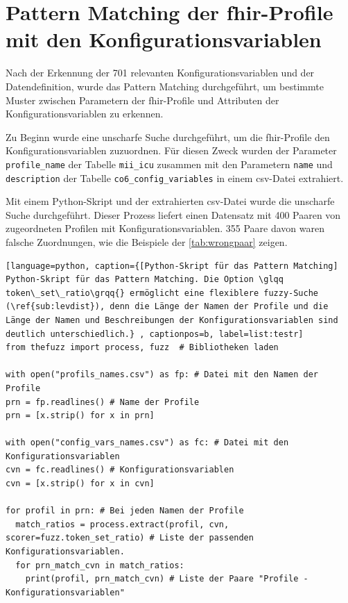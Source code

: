\section{Pattern Matching der \acs{fhir}-Profile mit den Konfigurationsvariablen} \label{sec:pattmach}

Nach der Erkennung der 701 relevanten Konfigurationsvariablen und der Datendefinition, wurde das Pattern Matching durchgeführt, um bestimmte Muster zwischen Parametern der \ac{fhir}-Profile und Attributen der Konfigurationsvariablen zu erkennen. 

Zu Beginn wurde eine unscharfe Suche durchgeführt, um die \ac{fhir}-Profile den Konfigurationsvariablen zuzuordnen. Für diesen Zweck wurden der Parameter \texttt{profile\_name} der Tabelle \texttt{mii\_icu} zusammen mit den Parametern \texttt{name} und \texttt{description} der Tabelle \texttt{co6\_config\_variables} in einem \ac{csv}-Datei extrahiert. 

Mit einem Python-Skript und der extrahierten \ac{csv}-Datei wurde die unscharfe Suche durchgeführt. Dieser Prozess liefert einen Datensatz mit 400 Paaren von zugeordneten Profilen mit Konfigurationsvariablen. 355 Paare davon waren falsche Zuordnungen, wie die Beispiele der \ref{tab:wrongpaar} zeigen.

\begin{lstlisting}[language=python, caption={[Python-Skript für das Pattern Matching] Python-Skript für das Pattern Matching. Die Option \glqq token\_set\_ratio\grqq{} ermöglicht eine flexiblere fuzzy-Suche (\ref{sub:levdist}), denn die Länge der Namen der Profile und die Länge der Namen und Beschreibungen der Konfigurationsvariablen sind deutlich unterschiedlich.} , captionpos=b, label=list:testr]
from thefuzz import process, fuzz  # Bibliotheken laden

with open("profils_names.csv") as fp: # Datei mit den Namen der Profile
prn = fp.readlines() # Name der Profile
prn = [x.strip() for x in prn] 

with open("config_vars_names.csv") as fc: # Datei mit den Konfigurationsvariablen
cvn = fc.readlines() # Konfigurationsvariablen
cvn = [x.strip() for x in cvn]

for profil in prn: # Bei jeden Namen der Profile
  match_ratios = process.extract(profil, cvn, scorer=fuzz.token_set_ratio) # Liste der passenden Konfigurationsvariablen.
  for prn_match_cvn in match_ratios: 
    print(profil, prn_match_cvn) # Liste der Paare "Profile - Konfigurationsvariablen"
   
\end{lstlisting}

